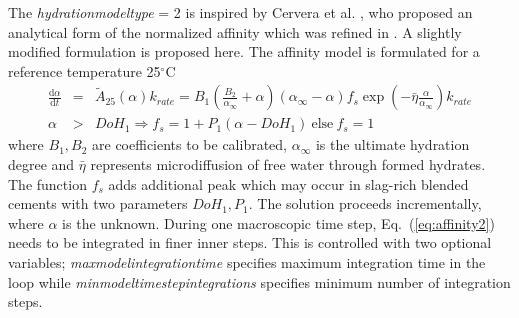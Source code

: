 \documentclass[a4paper]{article}
\newcommand{\param}[1]{{\it #1}}
\newcommand{\ud}{\mathrm{d}}
\newcommand{\refeq}[1]{Eq.~(\ref{#1})}
\newcommand{\C}{$^{\circ}\mathrm{C}$}
\begin{document}
The \param{hydrationmodeltype} = 2 is inspired by Cervera et al. \cite{Cervera:99}, who proposed an analytical form of the normalized affinity which was refined in \cite{Gawin:06a}. A slightly modified formulation is proposed here. The affinity model is formulated for a reference temperature 25\C
\begin{eqnarray}
\frac{\ud \alpha}{\ud t} &=& \tilde{A}_{25}(\alpha) k_{rate}= B_1 \left( \frac{B_2}{\alpha_\infty} + \alpha \right ) \left( \alpha_\infty - \alpha \right) f_s \exp\left(-\bar{\eta}\frac{\alpha}{\alpha_\infty}\right) k_{rate}\label{eq:affinity2}\\
\alpha &>& DoH_1 \Rightarrow f_s = 1+P_1(\alpha - DoH_1)~\mathrm{else}~f_s = 1 \label{eq:affinity3}
\end{eqnarray}
where $B_1, B_2$ are coefficients to be calibrated, $\alpha_\infty$ is the ultimate hydration degree and $\bar{\eta}$ represents microdiffusion of free water through formed hydrates. The function $f_s$ adds additional peak which may occur in slag-rich blended cements with two parameters $DoH_1,P_1$. The solution proceeds incrementally, where $\alpha$ is the unknown. During one macroscopic time step, \refeq{eq:affinity2} needs to be integrated in finer inner steps. This is controlled with two optional variables; \param{maxmodelintegrationtime} specifies maximum integration time in the loop while \param{minmodeltimestepintegrations} specifies minimum number of integration steps.
\end{document}
